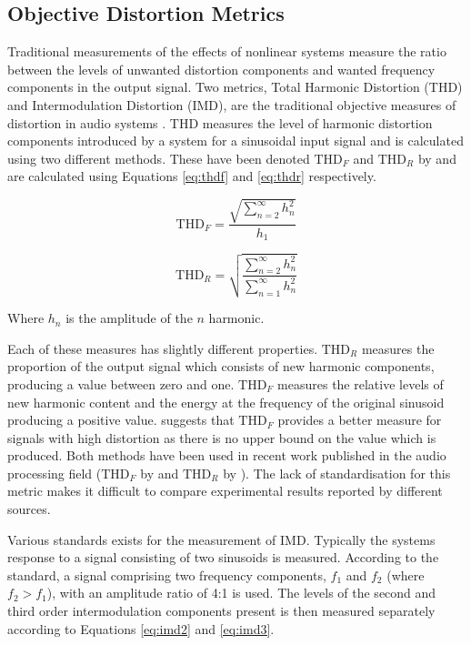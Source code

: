 	\subsection{Objective Distortion Metrics}
	\label{sec:Excitation-Analysis-Metrics}
		Traditional measurements of the effects of nonlinear systems measure the ratio between the levels of
		unwanted distortion components and wanted frequency components in the output signal. Two metrics, Total
		Harmonic Distortion (THD) and Intermodulation Distortion (IMD), are the traditional objective measures of
		distortion in audio systems \citep{czerwinski2001multitone1}. THD measures the level of harmonic distortion
		components introduced by a system for a sinusoidal input signal and is calculated using two different
		methods. These have been denoted $\mathrm{THD}_{F}$ and $\mathrm{THD}_{R}$ by \citet{shmilovitz2005on} and
		are calculated using Equations \ref{eq:thdf} and \ref{eq:thdr} respectively.

		\begin{equation}
			\mathrm{THD}_{F} = \frac{\sqrt{\sum_{n = 2}^{\infty} h_{n}^{2}}}{h_{1}}
			\label{eq:thdf}
		\end{equation}

		\begin{equation}
			\mathrm{THD}_{R} = \sqrt{\frac{\sum_{n = 2}^{\infty} h_{n}^{2}}
			                                       {\sum_{n = 1}^{\infty} h_{n}^{2}}}
			\label{eq:thdr}
		\end{equation}

		Where $h_n$ is the amplitude of the $n$ harmonic. 

		Each of these measures has slightly different properties. $\mathrm{THD}_{R}$ measures the proportion of the
		output signal which consists of new harmonic components, producing a value between zero and one.
		$\mathrm{THD}_{F}$ measures the relative levels of new harmonic content and the energy at the frequency of
		the original sinusoid producing a positive value. \citet{shmilovitz2005on} suggests that $\mathrm{THD}_{F}$
		provides a better measure for signals with high distortion as there is no upper bound on the value which is
		produced.  Both methods have been used in recent work published in the audio processing field
		($\mathrm{THD}_{F}$ by \citet{fleischmann2014a} and $\mathrm{THD}_{R}$ by \citet{dutilleux2011nonlinear}).
		The lack of standardisation for this metric makes it difficult to compare experimental results reported by
		different sources.

		Various standards exists for the measurement of IMD. Typically the systems response to a signal consisting
		of two sinusoids is measured. According to the \citet{IEC2001amplifiers} standard, a signal comprising two
		frequency components, $f_{1}$ and $f_{2}$ (where $f_{2} > f_{1}$), with an amplitude ratio of 4:1 is used.
		The levels of the second and third order intermodulation components present is then measured separately
		according to Equations \ref{eq:imd2} and \ref{eq:imd3}.

